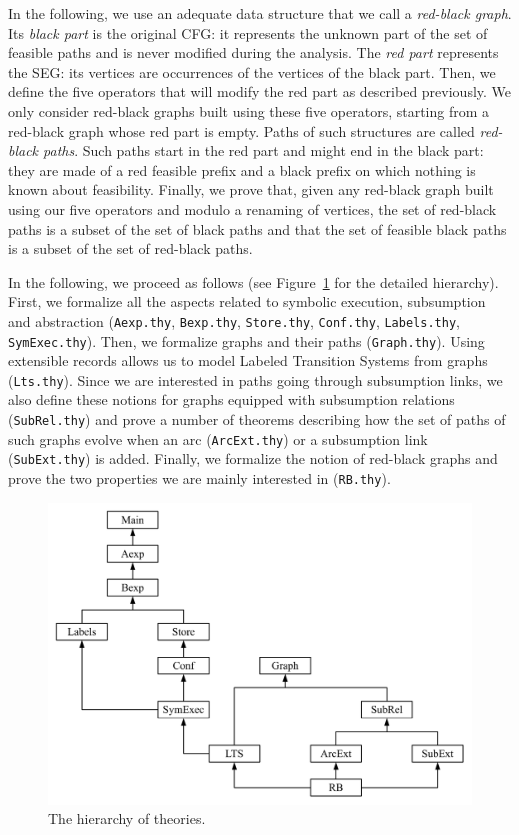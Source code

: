 In the following, we use an adequate data structure that 
we call a \emph{red-black graph}. Its \emph{black part} is the original CFG: it represents 
the unknown part of the set of feasible paths and is never modified during the analysis. The 
\emph{red part} represents the SEG: its vertices are occurrences of the vertices of the black part. 
Then, we define the five operators that will modify the red part 
as described previously. We only consider red-black graphs built using these five operators, 
starting from a red-black graph whose red part is empty. Paths of such structures are called 
\emph{red-black paths}. Such paths start in the red part and might end in the black part: they 
are made of a red feasible prefix and a black prefix on which nothing is known about feasibility.
Finally, we prove that, given any red-black graph built using our five operators and modulo a 
renaming of vertices, the set of red-black paths is a subset of the set of black paths and that 
the set of feasible black paths is a subset of the set of red-black paths. 

In the following, we proceed as follows (see Figure~\ref{fig:theory_hierarchy} for the detailed hierarchy). First, we formalize all the aspects related to symbolic 
execution, subsumption and abstraction (\verb?Aexp.thy?, \verb?Bexp.thy?, \verb?Store.thy?, 
\verb?Conf.thy?, \verb?Labels.thy?, 
\verb?SymExec.thy?). Then, we formalize graphs and their paths (\verb?Graph.thy?). Using extensible records allows 
us to model Labeled Transition Systems from graphs (\verb?Lts.thy?). Since we are 
interested in paths going through subsumption links, we also define these notions for graphs equipped 
with subsumption relations (\verb?SubRel.thy?) and prove a number of theorems describing how the 
set of paths of such graphs evolve when an arc (\verb?ArcExt.thy?) or a subsumption link 
(\verb?SubExt.thy?) is 
added. Finally, we formalize the notion of red-black graphs and prove the two 
properties we are mainly interested in (\verb?RB.thy?).

\begin{figure}
	\centering
	\includegraphics[scale=.5]{theory_hierarchy}
	\caption{The hierarchy of theories.}
	\label{fig:theory_hierarchy}
\end{figure}
